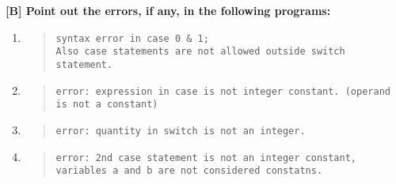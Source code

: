 \documentclass{report}
\begin{document}
\textbf{[B] Point out the errors, if any, in the following programs:}
\begin{enumerate}
    \renewcommand{\labelenumi}{\alph{enumi}}
  \item \begin{quote} \begin{verbatim} 
syntax error in case 0 & 1; 
Also case statements are not allowed outside switch statement.
  \end{verbatim} \end{quote}

  \item \begin{quote} \begin{verbatim} 
error: expression in case is not integer constant. (operand is not a constant)
  \end{verbatim} \end{quote}

  \item \begin{quote} \begin{verbatim} 
error: quantity in switch is not an integer.
  \end{verbatim} \end{quote}

  \item \begin{quote} \begin{verbatim} 
error: 2nd case statement is not an integer constant,
variables a and b are not considered constatns.
  \end{verbatim} \end{quote}
\end{enumerate}
\end{document}
